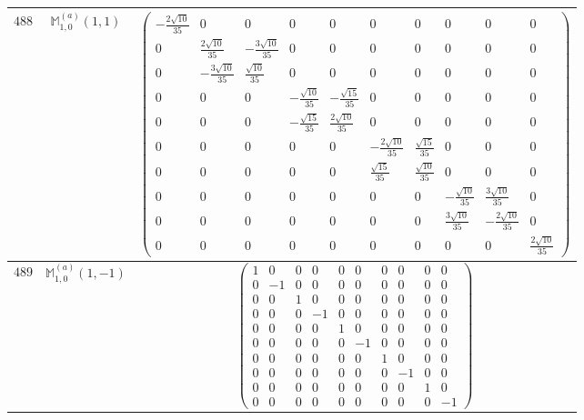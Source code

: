 \documentclass[fleqn,8pt,landscape]{jsarticle}
\begin{document}
\begin{center}
\begin{longtable}{ccc}
$ 488 $ & $ \mathbb{M}_{1,0}^{(a)}(1,1) $ & $ \begin{pmatrix} - \frac{2 \sqrt{10}}{35} & 0 & 0 & 0 & 0 & 0 & 0 & 0 & 0 & 0 \\ 0 & \frac{2 \sqrt{10}}{35} & - \frac{3 \sqrt{10}}{35} & 0 & 0 & 0 & 0 & 0 & 0 & 0 \\ 0 & - \frac{3 \sqrt{10}}{35} & \frac{\sqrt{10}}{35} & 0 & 0 & 0 & 0 & 0 & 0 & 0 \\ 0 & 0 & 0 & - \frac{\sqrt{10}}{35} & - \frac{\sqrt{15}}{35} & 0 & 0 & 0 & 0 & 0 \\ 0 & 0 & 0 & - \frac{\sqrt{15}}{35} & \frac{2 \sqrt{10}}{35} & 0 & 0 & 0 & 0 & 0 \\ 0 & 0 & 0 & 0 & 0 & - \frac{2 \sqrt{10}}{35} & \frac{\sqrt{15}}{35} & 0 & 0 & 0 \\ 0 & 0 & 0 & 0 & 0 & \frac{\sqrt{15}}{35} & \frac{\sqrt{10}}{35} & 0 & 0 & 0 \\ 0 & 0 & 0 & 0 & 0 & 0 & 0 & - \frac{\sqrt{10}}{35} & \frac{3 \sqrt{10}}{35} & 0 \\ 0 & 0 & 0 & 0 & 0 & 0 & 0 & \frac{3 \sqrt{10}}{35} & - \frac{2 \sqrt{10}}{35} & 0 \\ 0 & 0 & 0 & 0 & 0 & 0 & 0 & 0 & 0 & \frac{2 \sqrt{10}}{35} \end{pmatrix} $ \\ \hline
$ 489 $ & $ \mathbb{M}_{1,0}^{(a)}(1,-1) $ & $ \begin{pmatrix} 1 & 0 & 0 & 0 & 0 & 0 & 0 & 0 & 0 & 0 \\ 0 & -1 & 0 & 0 & 0 & 0 & 0 & 0 & 0 & 0 \\ 0 & 0 & 1 & 0 & 0 & 0 & 0 & 0 & 0 & 0 \\ 0 & 0 & 0 & -1 & 0 & 0 & 0 & 0 & 0 & 0 \\ 0 & 0 & 0 & 0 & 1 & 0 & 0 & 0 & 0 & 0 \\ 0 & 0 & 0 & 0 & 0 & -1 & 0 & 0 & 0 & 0 \\ 0 & 0 & 0 & 0 & 0 & 0 & 1 & 0 & 0 & 0 \\ 0 & 0 & 0 & 0 & 0 & 0 & 0 & -1 & 0 & 0 \\ 0 & 0 & 0 & 0 & 0 & 0 & 0 & 0 & 1 & 0 \\ 0 & 0 & 0 & 0 & 0 & 0 & 0 & 0 & 0 & -1 \end{pmatrix} $ \\ \hline

\end{longtable}
\end{center}
\end{document}
